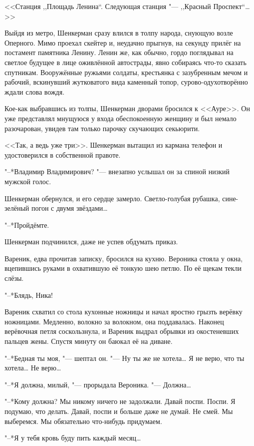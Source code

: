 <<Станция ,,Площадь Ленина``. Следующая станция "--- ,,Красный Проспект``\ldots{}>>

Выйдя из метро, Шенкерман сразу влился в толпу народа, снующую возле Оперного.
Мимо проехал скейтер и, неудачно прыгнув, на секунду прилёг на постамент памятника Ленину.
Ленин же, как обычно, гордо поглядывал на светлое будущее в лице оживлённой автострады, явно собираясь что-то сказать спутникам.
Вооружённые ружьями солдаты, крестьянка с зазубренным мечом и рабочий, вскинувший жутковатого вида каменный топор, сурово-одухотворённо ждали слова вождя.

Кое-как выбравшись из толпы, Шенкерман дворами бросился к <<Ауре>>.
Он уже представлял мнущуюся у входа обеспокоенную женщину и был немало разочарован, увидев там только парочку скучающих секьюрити.

<<Так, а ведь уже три>>.
Шенкерман вытащил из кармана телефон и удостоверился в собственной правоте.

"--*Владимир Владимирович? "--- внезапно услышал он за спиной низкий мужской голос.

Шенкерман обернулся, и его сердце замерло.
Светло-голубая рубашка, сине-зелёный погон с двумя звёздами\ldots{}

"--*Пройдёмте.

Шенкерман подчинился, даже не успев обдумать приказ.

\asterism

Вареник, едва прочитав записку, бросился на кухню.
Вероника стояла у окна, вцепившись руками в охватившую её тонкую шею петлю.
По её щекам текли слёзы.

"--*Блядь, Ника!

Вареник схватил со стола кухонные ножницы и начал яростно грызть верёвку ножницами.
Медленно, волокно за волокном, она поддавалась.
Наконец верёвочная петля соскользнула, и Вареник выдрал обрывки из окостеневших пальцев жены.
Спустя минуту он баюкал её на диване.

"--*Бедная ты моя, "--- шептал он.
"--- Ну ты же не хотела\ldots{}
Я не верю, что ты хотела\ldots{}
Не верю\ldots{}

"--*Я должна, милый, "--- прорыдала Вероника.
"--- Должна\ldots{}

"--*Кому должна?
Мы никому ничего не задолжали.
Давай поспи.
Поспи.
Я подумаю, что делать.
Давай, поспи и больше даже не думай.
Не смей.
Мы выберемся.
Мы обязательно что-нибудь придумаем.

"--*Я у тебя кровь буду пить каждый месяц\ldots{}

